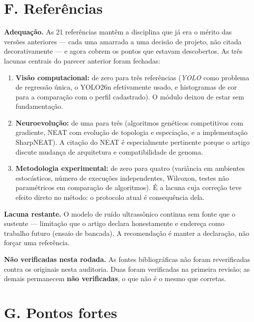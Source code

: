 \documentclass[11pt,a4paper]{article}
\begin{document}
\section*{F. Referências}

\textbf{Adequação.} As 21 referências mantêm a disciplina que já era o mérito das versões anteriores
--- cada uma amarrada a uma decisão de projeto, não citada decorativamente --- e agora cobrem os
pontos que estavam descobertos. As três lacunas centrais do parecer anterior foram fechadas:

\begin{enumerate}
  \item \textbf{Visão computacional:} de zero para três referências (\textit{YOLO} como problema de
  regressão única, o YOLO26n efetivamente usado, e histogramas de cor para a comparação com o perfil
  cadastrado). O módulo deixou de estar sem fundamentação.
  \item \textbf{Neuroevolução:} de uma para três (algoritmos genéticos competitivos com gradiente,
  NEAT com evolução de topologia e especiação, e a implementação SharpNEAT). A citação do NEAT é
  especialmente pertinente porque o artigo discute mudança de arquitetura e compatibilidade de
  genoma.
  \item \textbf{Metodologia experimental:} de zero para quatro (variância em ambientes estocásticos,
  número de execuções independentes, Wilcoxon, testes não paramétricos em comparação de algoritmos).
  É a lacuna cuja correção teve efeito direto no método: o protocolo atual é consequência dela.
\end{enumerate}

\textbf{Lacuna restante.} O modelo de ruído ultrassônico continua sem fonte que o sustente ---
limitação que o artigo declara honestamente e endereça como trabalho futuro (ensaio de bancada). A
recomendação é manter a declaração, não forçar uma referência.

\textbf{Não verificadas nesta rodada.} As fontes bibliográficas não foram reverificadas contra os
originais nesta auditoria. Duas foram verificadas na primeira revisão; as demais permanecem
\textbf{não verificadas}, o que não é o mesmo que corretas.

\section*{G. Pontos fortes}
\end{document}
